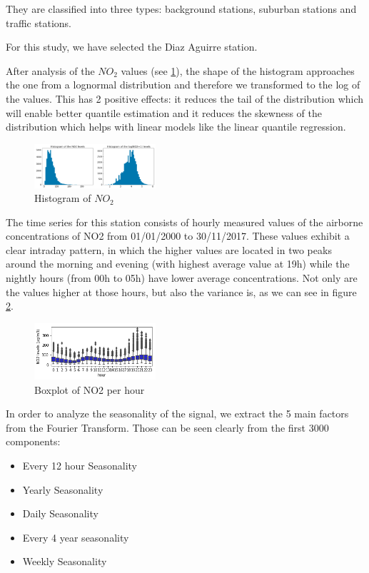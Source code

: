 \documentclass[a4paper,twocolumn,5p]{elsarticle}
\begin{document}
They are classified into 
three types: background stations, suburban stations 
and traffic stations.

For this study, we have selected the Diaz Aguirre station.

After analysis of the $NO_2$ values (see \ref{figure:histo_no2}), the shape 
of the histogram approaches the one from a lognormal distribution 
and therefore we transformed to 
the log of the values. This has 2 positive effects: it reduces the tail of the 
distribution which will enable better quantile estimation and it reduces the 
skewness of the distribution 
which helps with linear models like the linear quantile regression.

\begin{figure}
  \centering
  \includegraphics[width=0.4\textwidth]{histo_no2}
  \caption{Histogram of $NO_2$}
  \label{figure:histo_no2}
\end{figure}

The time series for this station consists of hourly
measured values of the airborne concentrations of NO2
from 01/01/2000 to 30/11/2017. These values exhibit a clear intraday 
pattern, in which the
higher values are located in two peaks around the morning
and evening (with highest average value at 19h) while the 
nightly hours (from 00h to 05h) have lower average concentrations. 
Not only are the values higher at those hours, but also
the variance is, as we can see in figure \ref{figure:variance}. 
 
\begin{figure}
  \centering
      \includegraphics[width=0.4\textwidth]{NO2Var}
  \caption{Boxplot of NO2 per hour}
\label{figure:variance}
\end{figure}

In order to analyze the seasonality of the signal, we extract the 5 main factors 
from the Fourier Transform. Those can be seen clearly from the first 3000 components:

\begin{itemize}
  \item Every 12 hour Seasonality
  \item Yearly Seasonality
  \item Daily Seasonality
  \item Every 4 year seasonality
  \item Weekly Seasonality
\end{itemize} 
\end{document}
